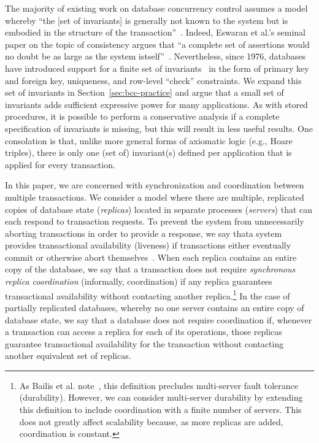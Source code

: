  The majority of existing work on
database concurrency control assumes a model whereby ``the [set of
  invariants] is generally not known to the system but is embodied in
the structure of the transaction''~\cite{traiger-tods}. Indeed,
Eswaran et al.'s seminal paper on the topic of consistency argues that
``a complete set of assertions would no doubt be as large as the
system istself''~\cite{eswaran-consistency}. Nevertheless, since 1976,
databases have introduced support for a finite set of invariants~\cite{korth-serializability} in
the form of primary key and foreign key, uniqueness, and row-level
``check'' constraints. We expand this set of invariants in
Section~\ref{sec:bcc-practice} and argue that a small set of
invariants adds sufficient expressive power for many applications. As
with stored procedures, it is possible to perform a conservative
analysis if a complete specification of invariants is missing, but
this will result in less useful results. One consolation is that,
unlike more general forms of axiomatic logic (e.g., Hoare triples),
there is only one (set of) invariant(s) defined per application that
is applied for every transaction.\vspace{.5em}

 In this paper, we are concerned with
synchronization and coordination between multiple transactions. We
consider a model where there are multiple, replicated copies of
database state (\textit{replicas}) located in separate processes
(\textit{servers}) that can each respond to transaction requests.  To
prevent the system from unnecessarily aborting transactions in order
to provide a response, we say thata system provides transactional
availability (liveness) if transactions either eventually commit or
otherwise abort themselves~\cite{hat-vldb}. When each replica contains
an entire copy of the database, we say that a transaction does not
require \textit{synchronous replica coordination} (informally,
coordination) if any replica guarantees transactional availability
without contacting another replica.\footnote{As Bailis et
  al. note~\cite{hat-vldb}, this definition precludes multi-server
  fault tolerance (durability). However, we can consider multi-server
  durability by extending this definition to include coordination with
  a finite number of servers. This does not greatly affect scalability
  because, as more replicas are added, coordination is constant.}  In
the case of partially replicated databases, whereby no one server
contains an entire copy of database state, we say that a database does
not require coordination if, whenever a transaction can access a
replica for each of its operations, those replicas guarantee
transactional availability for the transaction without contacting
another equivalent set of replicas.

